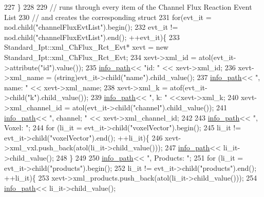 \begin{DoxyCode}
227     \}
228 
229 \textcolor{comment}{//  runs through every item of the Channel Flux Reaction Event List}
230 \textcolor{comment}{//  and creates the corresponding struct}
231     \textcolor{keywordflow}{for}(evt\_it = nod.child(\textcolor{stringliteral}{"channelFluxEvtList"}).begin();
232         evt\_it != nod.child(\textcolor{stringliteral}{"channelFluxEvtList"}).end(); ++evt\_it)\{
233         Standard\_Ipt::xml\_ChFlux\_Rct\_Evt* xevt = \textcolor{keyword}{new} Standard\_Ipt::xml\_ChFlux\_Rct\_Evt;
234         xevt->xml\_id = atol(evt\_it->attribute(\textcolor{stringliteral}{"id"}).value());
235         \hyperlink{classnw_1_1_standard___ipt_a7b8147e8b90f4adabb30e1b3fd8c40b8}{info\_path}<< \textcolor{stringliteral}{"id: "} << xevt->xml\_id;
236         xevt->xml\_name = (string)evt\_it->child(\textcolor{stringliteral}{"name"}).child\_value();
237         \hyperlink{classnw_1_1_standard___ipt_a7b8147e8b90f4adabb30e1b3fd8c40b8}{info\_path}<< \textcolor{stringliteral}{", name: "} << xevt->xml\_name;
238         xevt->xml\_k = atof(evt\_it->child(\textcolor{stringliteral}{"k"}).child\_value());
239         \hyperlink{classnw_1_1_standard___ipt_a7b8147e8b90f4adabb30e1b3fd8c40b8}{info\_path}<< \textcolor{stringliteral}{", k: "} <<xevt->xml\_k;
240         xevt->xml\_channel\_id = atol(evt\_it->child(\textcolor{stringliteral}{"channel"}).child\_value());
241         \hyperlink{classnw_1_1_standard___ipt_a7b8147e8b90f4adabb30e1b3fd8c40b8}{info\_path}<< \textcolor{stringliteral}{", channel; "} << xevt->xml\_channel\_id;
242 
243         \hyperlink{classnw_1_1_standard___ipt_a7b8147e8b90f4adabb30e1b3fd8c40b8}{info\_path}<< \textcolor{stringliteral}{", Voxel: "};
244         \textcolor{keywordflow}{for} (li\_it = evt\_it->child(\textcolor{stringliteral}{"voxelVector"}).begin();
245                 li\_it != evt\_it->child(\textcolor{stringliteral}{"voxelVector"}).end(); ++li\_it)\{
246             xevt->xml\_vxl.push\_back(atol(li\_it->child\_value()));
247             \hyperlink{classnw_1_1_standard___ipt_a7b8147e8b90f4adabb30e1b3fd8c40b8}{info\_path}<< li\_it->child\_value();
248         \}
249 
250         \hyperlink{classnw_1_1_standard___ipt_a7b8147e8b90f4adabb30e1b3fd8c40b8}{info\_path}<< \textcolor{stringliteral}{", Products: "};
251         \textcolor{keywordflow}{for} (li\_it = evt\_it->child(\textcolor{stringliteral}{"products"}).begin();
252                 li\_it != evt\_it->child(\textcolor{stringliteral}{"products"}).end(); ++li\_it)\{
253             xevt->xml\_products.push\_back(atol(li\_it->child\_value()));
254             \hyperlink{classnw_1_1_standard___ipt_a7b8147e8b90f4adabb30e1b3fd8c40b8}{info\_path}<< li\_it->child\_value();

\end{DoxyCode}

